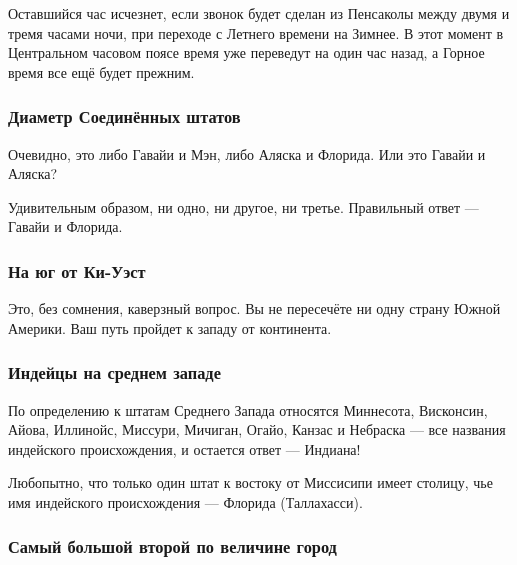 Оставшийся час исчезнет, если звонок будет сделан из Пенсаколы между двумя и тремя часами ночи, при переходе с Летнего времени на Зимнее. 
В этот момент в Центральном часовом поясе время уже переведут на один час назад, а Горное время все ещё будет прежним.\heart 


       
                                  
\subsubsection*{Диаметр Соединённых штатов}%


Очевидно, это либо Гавайи и Мэн, либо Аляска и Флорида. Или это Гавайи и Аляска?

\medskip

Удивительным образом, ни одно, ни другое, ни третье. Правильный ответ --- Гавайи и Флорида.\heart




\subsubsection*{На юг от Ки-Уэст}%


Это, без сомнения, каверзный вопрос. %
Вы не пересечёте ни одну страну Южной Америки. 
Ваш путь пройдет к западу от континента. 
\heart


\subsubsection*{Индейцы на среднем западе}%


По определению к штатам Среднего Запада относятся Миннесота, Висконсин, Айова,
Иллинойс, Миссури, Мичиган, Огайо, Канзас и Небраска --- все названия индейского
происхождения, и остается ответ --- Индиана!\heart


Любопытно, что только один штат к востоку от Миссисипи имеет столицу, чье имя индейского происхождения --- Флорида (Таллахасси).




\subsubsection*{Самый большой второй по величине город}%


